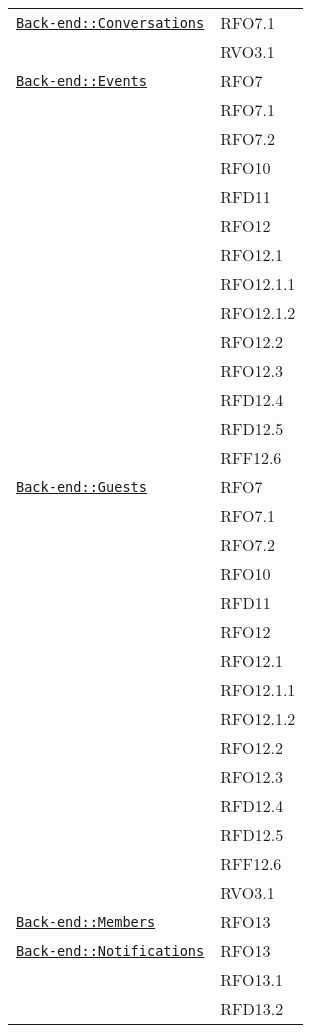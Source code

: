 \begin{longtable}{|>{\centering}m{10cm}|m{3cm}<{\centering}|}
\hyperref[Back-end::Conversations]{\texttt{Back-end::Conversations}} & RFO7.1\\
& RVO3.1\\ \hline

\hyperref[Back-end::Events]{\texttt{Back-end::Events}} & RFO7\\
& RFO7.1\\
& RFO7.2\\
& RFO10\\
& RFD11\\
& RFO12\\
& RFO12.1\\
& RFO12.1.1\\
& RFO12.1.2\\
& RFO12.2\\
& RFO12.3\\
& RFD12.4\\
& RFD12.5\\
& RFF12.6\\ \hline

\hyperref[Back-end::Guests]{\texttt{Back-end::Guests}} & RFO7\\
& RFO7.1\\
& RFO7.2\\
& RFO10\\
& RFD11\\
& RFO12\\
& RFO12.1\\
& RFO12.1.1\\
& RFO12.1.2\\
& RFO12.2\\
& RFO12.3\\
& RFD12.4\\
& RFD12.5\\
& RFF12.6\\
& RVO3.1\\ \hline

\hyperref[Back-end::Members]{\texttt{Back-end::Members}} & RFO13\\ \hline

\hyperref[Back-end::Notifications]{\texttt{Back-end::Notifications}} & RFO13\\
& RFO13.1\\
& RFD13.2\\ \hline


\end{longtable}
